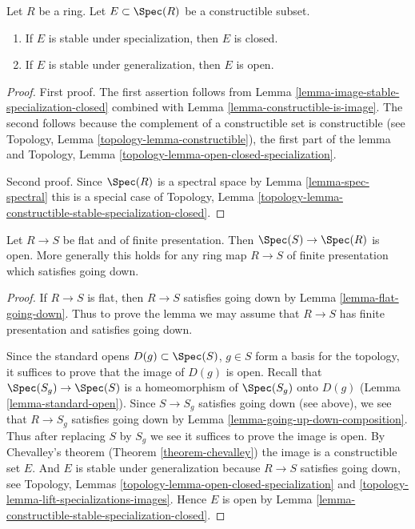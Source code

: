 \begin{lemma}
\label{lemma-constructible-stable-specialization-closed}
Let $R$ be a ring. Let $E \subset \Spec(R)$ be a constructible subset.
\begin{enumerate}
\item If $E$ is stable under specialization, then $E$ is closed.
\item If $E$ is stable under generalization, then $E$ is open.
\end{enumerate}
\end{lemma}

\begin{proof}
First proof. The first assertion
follows from Lemma \ref{lemma-image-stable-specialization-closed}
combined with Lemma \ref{lemma-constructible-is-image}.
The second follows because the complement of a constructible
set is constructible
(see Topology, Lemma \ref{topology-lemma-constructible}),
the first part of the lemma and Topology,
Lemma \ref{topology-lemma-open-closed-specialization}.

\medskip\noindent
Second proof. Since $\Spec(R)$ is a spectral space by
Lemma \ref{lemma-spec-spectral} this is a special case of
Topology, Lemma
\ref{topology-lemma-constructible-stable-specialization-closed}.
\end{proof}

\begin{proposition}
\label{proposition-fppf-open}
Let $R \to S$ be flat and of finite presentation.
Then $\Spec(S) \to \Spec(R)$ is open.
More generally this holds for any ring map $R \to S$ of
finite presentation which satisfies going down.
\end{proposition}

\begin{proof}
If $R \to S$ is flat, then $R \to S$ satisfies going down by
Lemma \ref{lemma-flat-going-down}. Thus to prove the lemma we may
assume that $R \to S$ has finite presentation and satisfies going down.

\medskip\noindent
Since the standard opens $D(g) \subset \Spec(S)$, $g \in S$
form a basis for the topology, it suffices to prove that the
image of $D(g)$ is open. Recall that $\Spec(S_g) \to \Spec(S)$
is a homeomorphism of $\Spec(S_g)$ onto $D(g)$
(Lemma \ref{lemma-standard-open}).
Since $S \to S_g$ satisfies going down (see above), we see that
$R \to S_g$ satisfies going down by
Lemma \ref{lemma-going-up-down-composition}. Thus after replacing
$S$ by $S_g$ we see it suffices to prove the image is open.
By Chevalley's theorem (Theorem \ref{theorem-chevalley})
the image is a constructible set $E$. And $E$ is stable
under generalization because $R \to S$ satisfies going down,
see Topology, Lemmas \ref{topology-lemma-open-closed-specialization}
and \ref{topology-lemma-lift-specializations-images}.
Hence $E$ is open by
Lemma \ref{lemma-constructible-stable-specialization-closed}.
\end{proof}

